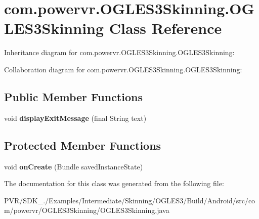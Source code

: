 \hypertarget{classcom_1_1powervr_1_1_o_g_l_e_s3_skinning_1_1_o_g_l_e_s3_skinning}{\section{com.\+powervr.\+O\+G\+L\+E\+S3\+Skinning.\+O\+G\+L\+E\+S3\+Skinning Class Reference}
\label{classcom_1_1powervr_1_1_o_g_l_e_s3_skinning_1_1_o_g_l_e_s3_skinning}
}


Inheritance diagram for com.\+powervr.\+O\+G\+L\+E\+S3\+Skinning.\+O\+G\+L\+E\+S3\+Skinning\+:


Collaboration diagram for com.\+powervr.\+O\+G\+L\+E\+S3\+Skinning.\+O\+G\+L\+E\+S3\+Skinning\+:
\subsection*{Public Member Functions}
\begin{DoxyCompactItemize}
\item 
\hypertarget{classcom_1_1powervr_1_1_o_g_l_e_s3_skinning_1_1_o_g_l_e_s3_skinning_af52c644b835ba7db3eb89a730e4e01c9}{void {\bfseries display\+Exit\+Message} (final String text)}\label{classcom_1_1powervr_1_1_o_g_l_e_s3_skinning_1_1_o_g_l_e_s3_skinning_af52c644b835ba7db3eb89a730e4e01c9}

\end{DoxyCompactItemize}
\subsection*{Protected Member Functions}
\begin{DoxyCompactItemize}
\item 
\hypertarget{classcom_1_1powervr_1_1_o_g_l_e_s3_skinning_1_1_o_g_l_e_s3_skinning_a82fb98abcaa71b274717cd5e965befcb}{void {\bfseries on\+Create} (Bundle saved\+Instance\+State)}\label{classcom_1_1powervr_1_1_o_g_l_e_s3_skinning_1_1_o_g_l_e_s3_skinning_a82fb98abcaa71b274717cd5e965befcb}

\end{DoxyCompactItemize}


The documentation for this class was generated from the following file\+:\begin{DoxyCompactItemize}
\item 
P\+V\+R/\+S\+D\+K\+\_./\+Examples/\+Intermediate/\+Skinning/\+O\+G\+L\+E\+S3/\+Build/\+Android/src/com/powervr/\+O\+G\+L\+E\+S3\+Skinning/O\+G\+L\+E\+S3\+Skinning.\+java\end{DoxyCompactItemize}
